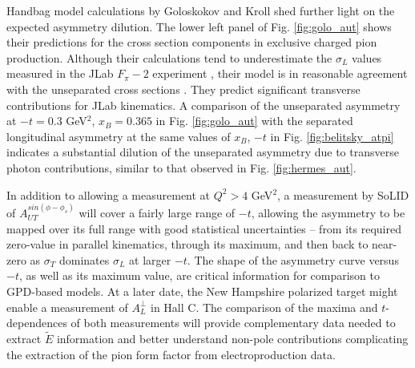 Handbag model calculations by Goloskokov and Kroll \cite{GoPC} shed further
light on the expected asymmetry dilution.  The lower left panel of
Fig. \ref{fig:golo_aut} shows their predictions for the cross section
components in exclusive charged pion production.  Although their calculations
tend to underestimate the $\sigma_L$ values measured in the JLab $F_{\pi}-2$
experiment \cite{Fpi2}, their model is in reasonable agreement with the
unseparated cross sections \cite{Go10}.  They predict significant transverse
contributions for JLab kinematics.  A comparison of the unseparated asymmetry
at $-t=0.3$ GeV$^2$, $x_B=0.365$ in Fig. \ref{fig:golo_aut} with the separated
longitudinal asymmetry at the same values of $x_B$, $-t$ in
Fig. \ref{fig:belitsky_atpi} indicates a substantial dilution of the
unseparated asymmetry due to transverse photon contributions, similar to that
observed in Fig. \ref{fig:hermes_aut}.

In addition to allowing a measurement at $Q^2>4$ GeV$^2$, a measurement by
SoLID of $A_{UT}^{sin(\phi-\phi_s)}$ will cover a fairly large range of $-t$,
allowing the asymmetry to be mapped over its full range with good statistical
uncertainties -- from its required zero-value in parallel kinematics, through
its maximum, and then back to near-zero as $\sigma_T$ dominates $\sigma_L$ at
larger $-t$.  The shape of the asymmetry curve versus $-t$, as well as its
maximum value, are critical information for comparison to GPD-based models.  At
a later date, the New Hampshire polarized target might enable a measurement of
$A_L^{\perp}$ in Hall C.  The
comparison of the maxima and $t$-dependences of both measurements will provide
complementary data needed to extract $\tilde{E}$ information and better
understand non-pole contributions complicating the extraction of the pion form
factor from electroproduction data.
